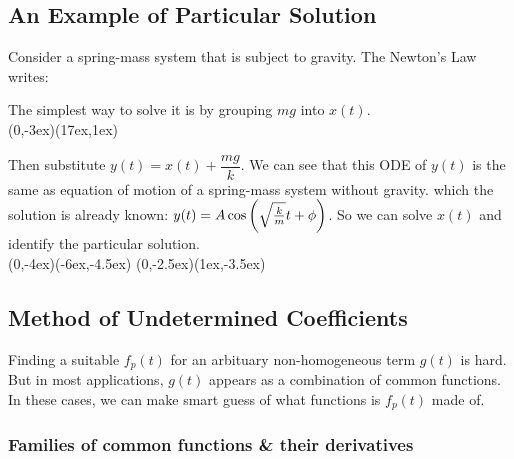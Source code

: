 \documentclass[class=article, crop=false, 12pt]{standalone}
\begin{document}
\subsection{An Example of Particular Solution}

Consider a spring-mass system that is subject to gravity. 
The Newton's  Law writes:


The simplest way to solve it is by grouping $mg$ into $x(t)$. 
\\
{(0,-3ex)}{(17ex,1ex)}

Then substitute $y(t) = x(t) + \dfrac{mg}{k}$. 
We can see that this ODE of $y(t)$ is the same as equation of motion of a spring-mass system without gravity.
which the solution is already known: $y(t) = A\cos\qty(\sqrt{\frac{k}{m}}t+\phi)$.
So we can solve $x(t)$ and identify the particular solution.
\\[4em]
{(0,-4ex)}{(-6ex,-4.5ex)}
{(0,-2.5ex)}{(1ex,-3.5ex)}


\subsection{Method of Undetermined Coefficients}

Finding a suitable $f_p(t)$ for an arbituary non-homogeneous term $g(t)$ is hard. 
But in most applications, $g(t)$ appears as a combination of common functions.
In these cases, we can make smart guess of what functions is $f_p(t)$ made of.

\subsubsection{Families of common functions \& their derivatives}
\end{document}
